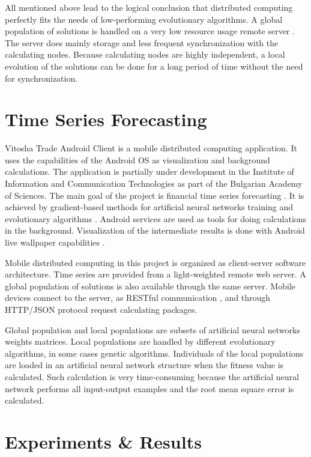 \documentclass[conference]{IEEEtran}
\begin{document}
All mentioned above lead to the logical conclusion that distributed computing perfectly fits the needs of low-performing evolutionary algorithms. A global population of solutions is handled on a very low resource usage remote server \cite{Gong-2015-a}. The server does mainly storage and less frequent synchronization with the calculating nodes. Because calculating nodes are highly independent, a local evolution of the solutions can be done for a long period of time without the need for synchronization. 

\section{Time Series Forecasting}

Vitosha Trade Android Client \cite{Balabanov-2022-a} is a mobile distributed computing application. It uses the capabilities of the Android OS as visualization and background calculations. The application is partially under development in the Institute of Information and Communication Technologies as part of the Bulgarian Academy of Sciences. The main goal of the project is financial time series forecasting \cite{Kolarik-1994-a}. It is achieved by gradient-based methods for artificial neural networks training \cite{Tomov-2021-a} and evolutionary algorithms \cite{Tomov-2021-b}. Android services are used as tools for doing calculations in the background. Visualization of the intermediate results is done with Android live wallpaper capabilities \cite{Mateeva-2021-a}. 

Mobile distributed computing in this project is organized as client-server \cite{Sinha-1992-a} software architecture. Time series are provided from a light-weighted remote web server. A global population of solutions is also available through the same server. Mobile devices connect to the server, as RESTful communication \cite{Orellana-2012-a}, and through HTTP/JSON protocol request calculating packages. 

Global population and local populations are subsets of artificial neural networks weights matrices. Local populations are handled by different evolutionary algorithms, in some cases genetic algorithms. Individuals of the local populations are loaded in an artificial neural network structure when the fitness value is calculated. Such calculation is very time-consuming because the artificial neural network performs all input-output examples and the root mean square error is calculated. 

\section{Experiments \& Results}
\end{document}
